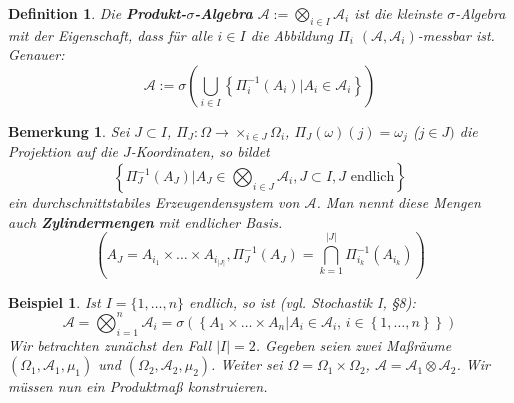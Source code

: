\documentclass[a4paper,11pt]{book}
\def\AA{ \mathcal{A} }
\newtheorem*{DefON}{Definition}
\newtheorem{Bsp}{Beispiel}[chapter]
\newtheorem*{BemON}{Bemerkung}
\theoremstyle{nonumberplain}
\begin{document}
\begin{DefON} Die \textbf{Produkt-$\sigma$-Algebra} $\AA:=\bigotimes_{i\in I}\AA_i$ ist die kleinste $\sigma$-Algebra mit der Eigenschaft, dass für alle $i\in I$ die Abbildung $\Pi_i$ $(\AA,\AA_i)$-messbar ist. Genauer: \\
\begin{displaymath}
\AA := \sigma \left( \bigcup_{i\in I} \left\{ \Pi^{-1}_i(A_i) | A_i \in \AA_i\right\}\right)
\end{displaymath}
\end{DefON}

\begin{BemON} Sei $J\subset I$, $\Pi_J:\Omega\to\times_{i\in J}\Omega_i$, $\Pi_J(\omega)(j)=\omega_j$ ($j\in J)$ die Projektion auf die $J$-Koordinaten, so bildet \\
\begin{displaymath}
\left\{\Pi_J^{-1}\left(A_J\right) | A_J \in \bigotimes_{i\in J} \AA_i, J\subset I, J\text{ endlich}\right\}
\end{displaymath}
ein durchschnittstabiles Erzeugendensystem von $\AA$. Man nennt diese Mengen auch \textbf{Zylindermengen} mit endlicher Basis.
\begin{displaymath}
\left( A_J=A_{i_1}\times\dots\times A_{i_{|J|}}, \Pi_J^{-1}\left( A_J\right)=\bigcap_{k=1}^{|J|}\Pi_{i_k}^{-1}\left( A_{i_k}\right)\right)
\end{displaymath}
\end{BemON}

\begin{Bsp} \label{Bsp3.1} Ist $I=\{1,\dots,n\}$ endlich, so ist (vgl. Stochastik I, §8): \\
\begin{displaymath}
\AA=\bigotimes_{i=1}^n\AA_i=\sigma\left(\left\{A_1\times\dots\times A_n | A_i\in\AA_i\text{, }i\in\left\{1,\dots,n\right\}\right\}\right)
\end{displaymath}
Wir betrachten zunächst den Fall $|I|=2$. Gegeben seien zwei Maßräume $(\Omega_1,\AA_1,\mu_1)$ und $(\Omega_2,\AA_2,\mu_2)$. Weiter sei $\Omega=\Omega_1\times\Omega_2$, $\AA=\AA_1\otimes\AA_2$. Wir müssen nun ein Produktmaß konstruieren.
\end{Bsp}
\end{document}
